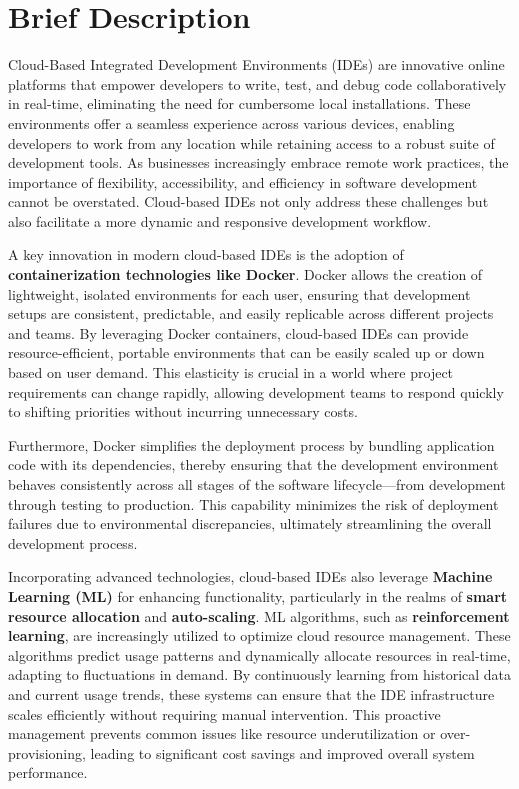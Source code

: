 \documentclass[12pt,a4paper,final]{report}
\begin{document}
\section{Brief Description}

Cloud-Based Integrated Development Environments (IDEs) are innovative online platforms that empower developers to write, test, and debug code collaboratively in real-time, eliminating the need for cumbersome local installations. These environments offer a seamless experience across various devices, enabling developers to work from any location while retaining access to a robust suite of development tools. As businesses increasingly embrace remote work practices, the importance of flexibility, accessibility, and efficiency in software development cannot be overstated. Cloud-based IDEs not only address these challenges but also facilitate a more dynamic and responsive development workflow.

A key innovation in modern cloud-based IDEs is the adoption of \textbf{containerization technologies like Docker}. Docker allows the creation of lightweight, isolated environments for each user, ensuring that development setups are consistent, predictable, and easily replicable across different projects and teams. By leveraging Docker containers, cloud-based IDEs can provide resource-efficient, portable environments that can be easily scaled up or down based on user demand. This elasticity is crucial in a world where project requirements can change rapidly, allowing development teams to respond quickly to shifting priorities without incurring unnecessary costs.

Furthermore, Docker simplifies the deployment process by bundling application code with its dependencies, thereby ensuring that the development environment behaves consistently across all stages of the software lifecycle—from development through testing to production. This capability minimizes the risk of deployment failures due to environmental discrepancies, ultimately streamlining the overall development process.

Incorporating advanced technologies, cloud-based IDEs also leverage \textbf{Machine Learning (ML)} for enhancing functionality, particularly in the realms of \textbf{smart resource allocation} and \textbf{auto-scaling}. ML algorithms, such as \textbf{reinforcement learning}, are increasingly utilized to optimize cloud resource management. These algorithms predict usage patterns and dynamically allocate resources in real-time, adapting to fluctuations in demand. By continuously learning from historical data and current usage trends, these systems can ensure that the IDE infrastructure scales efficiently without requiring manual intervention. This proactive management prevents common issues like resource underutilization or over-provisioning, leading to significant cost savings and improved overall system performance.
\end{document}

